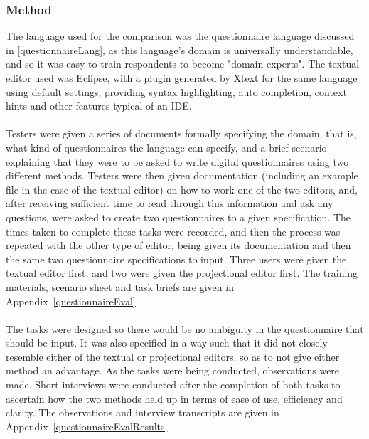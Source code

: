 \documentclass{article}
\begin{document}
{\subsubsection{Method}
The language used for the comparison was the questionnaire language discussed in \ref{questionnaireLang}, as this language's domain is universally understandable, and so it was easy to train respondents to become "domain experts". The textual editor used was Eclipse, with a plugin generated by Xtext for the same language using default settings, providing syntax highlighting, auto completion, context hints and other features typical of an IDE.
\\
\\
Testers were given a series of documents formally specifying the domain, that is, what kind of  questionnaires the language can specify, and a brief scenario explaining that they were to be asked to write digital questionnaires using two different methods. Testers were then given documentation (including an example file in the case of the textual editor) on how to work one of the two editors, and, after receiving sufficient time to read through this information and ask any questions, were asked to create two questionnaires to a given specification. The times taken to complete these tasks were recorded, and then the process was repeated with the other type of editor, being given its documentation and then the same two questionnaire specifications to input. Three users were given the textual editor first, and two were given the projectional editor first. The training materials, scenario sheet and task briefs are given in Appendix~\ref{questionnaireEval}.
\\
\\
The tasks were designed so there would be no ambiguity in the questionnaire that should be input. It was also specified in a way such that it did not closely resemble either of the textual or projectional editors, so as to not give either method an advantage. As the tasks were being conducted, observations were made. Short interviews were conducted after the completion of both tasks to ascertain how the two methods held up in terms of ease of use, efficiency and clarity. The observations and interview transcripts are given in Appendix~\ref{questionnaireEvalResults}.

}
\end{document}
